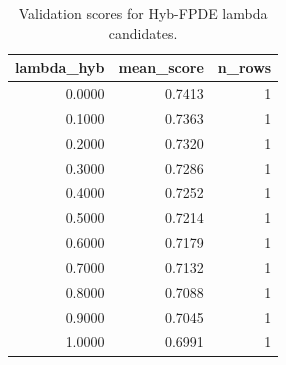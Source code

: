 \begin{table}[t]
\caption{Validation scores for Hyb-FPDE lambda candidates.}
\label{tab:lambda_distribution_computed}
\centering
\begin{tabular}{rrr}
\toprule
lambda\_hyb & mean\_score & n\_rows \\
\midrule
0.0000 & 0.7413 & 1 \\
0.1000 & 0.7363 & 1 \\
0.2000 & 0.7320 & 1 \\
0.3000 & 0.7286 & 1 \\
0.4000 & 0.7252 & 1 \\
0.5000 & 0.7214 & 1 \\
0.6000 & 0.7179 & 1 \\
0.7000 & 0.7132 & 1 \\
0.8000 & 0.7088 & 1 \\
0.9000 & 0.7045 & 1 \\
1.0000 & 0.6991 & 1 \\
\bottomrule
\end{tabular}

\end{table}
